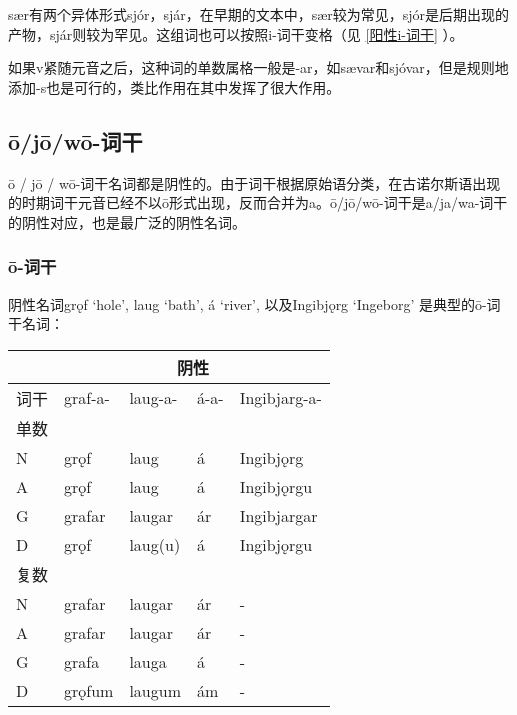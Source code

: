 sær有两个异体形式sjór，sjár，在早期的文本中，sær较为常见，sjór是后期出现的产物，sjár则较为罕见。这组词也可以按照i-词干变格（见 \ref{阳性i-词干} ）。

如果v紧随元音之后，这种词的单数属格一般是-ar，如sævar和sjóvar，但是规则地添加-s也是可行的，类比作用在其中发挥了很大作用。

\subsection{ō/jō/wō-词干}
\label{ō/jō/wō-词干}

ō / jō /
wō-词干名词都是阴性的。由于词干根据原始语分类，在古诺尔斯语出现的时期词干元音已经不以ō形式出现，反而合并为a。ō/jō/wō-词干是a/ja/wa-词干的阴性对应，也是最广泛的阴性名词。

\subsubsection{ō-词干}

阴性名词grǫf `hole', laug `bath', á `river‌', 以及Ingibjǫrg `Ingeborg‌'
是典型的ō-词干名词：

\begin{longtable}{lllll}
  \toprule
     & \multicolumn{4}{c}{\textbf{阴性}}                                 \\
  \midrule
  \endhead
  \bottomrule
  \endfoot
  词干 & graf-a-                         & laug-a- & á-a- & Ingibjarg-a- \\
  单数 &                                 &         &      &              \\
  N  & grǫf                            & laug    & á    & Ingibjǫrg    \\
  A  & grǫf                            & laug    & á    & Ingibjǫrgu   \\
  G  & grafar                          & laugar  & ár   & Ingibjargar  \\
  D  & grǫf                            & laug(u) & á    & Ingibjǫrgu   \\
  复数 &                                 &         &      &              \\
  N  & grafar                          & laugar  & ár   & -            \\
  A  & grafar                          & laugar  & ár   & -            \\
  G  & grafa                           & lauga   & á    & -            \\
  D  & grǫfum                          & laugum  & ám   & -            \\
\end{longtable}

